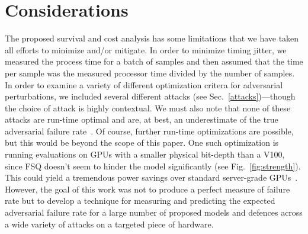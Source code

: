 \section{Considerations}
The proposed survival and cost analysis  has some limitations that we have taken all efforts to minimize and/or mitigate. In order to minimize timing jitter, we measured the process time for a batch of samples and then assumed that the time per sample was the measured processor time divided by the number of samples. In order to examine a variety of different optimization critera for adversarial perturbations, we included several different attacks (see Sec.~\ref{attacks})---though the choice of attack is highly contextual. We must also note that none of these attacks are run-time optimal and are, at best, an underestimate of the true adversarial failure rate~\citep{meyers}. Of course, further run-time optimizations are possible, but this would be beyond the scope of this paper.
One such optimization is running evaluations on GPUs with a smaller physical bit-depth than a V100, since FSQ doesn't seem to hinder the model significantly (see Fig.~\ref{fig:strength}). This could yield a tremendous power savings over standard server-grade GPUs~\citep{chou2023applicability}.
However, the goal of this work was not to produce a perfect measure of failure rate but to develop a technique for measuring and predicting the expected adversarial failure rate for a large number of proposed models and defences across a wide variety of attacks on a targeted piece of hardware.


